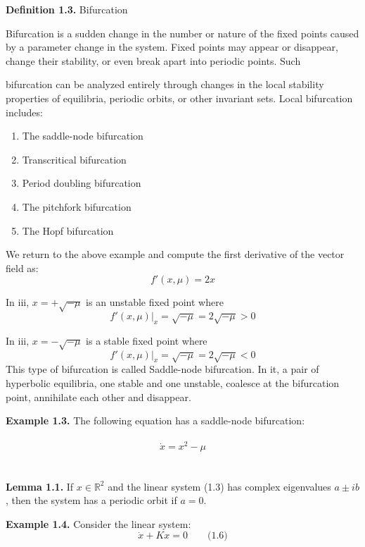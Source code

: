 \documentclass[17pt]{extarticle}
\begin{document}
\textbf{Definition 1.3.} Bifurcation

Bifurcation is a sudden change in the number or nature of the fixed points caused by a parameter change in the system. Fixed points may appear or disappear, change their stability, or even break apart into periodic points. Such

\newpage 



bifurcation can be analyzed entirely through changes in the local stability properties of equilibria, periodic orbits, or other invariant sets. Local bifurcation includes:
\begin{enumerate}
    \item The saddle-node bifurcation
    \item Transcritical bifurcation
    \item Period doubling bifurcation
    \item The pitchfork bifurcation
    \item The Hopf bifurcation
\end{enumerate}
We return to the above example and compute the first derivative of the vector field as:
\begin{equation}
f'(x, \mu) = 2x
\end{equation}


\newpage 

In iii, \(x = +\sqrt{-\mu}\) is an unstable fixed point where
\[
f'(x, \mu) \bigg|_{x} = \sqrt{-\mu} = 2\sqrt{-\mu} > 0
\]

In iii, \(x= - \sqrt{-\mu}\) is a stable fixed point where
\[
f'(x, \mu) \bigg|_{x} = \sqrt{-\mu} = 2\sqrt{-\mu} < 0
\]
This type of bifurcation is called Saddle-node bifurcation. In it, a pair of hyperbolic equilibria, one stable and one unstable, coalesce at the bifurcation point, annihilate each other and disappear.

\textbf{Example 1.3.} The following equation has a saddle-node bifurcation:
\\
\\
\[
\dot{x} = x^2 - \mu
\]
\\
\\
\textbf{Lemma 1.1.} If \(x \in \mathbb{R}^2\) and the linear system (1.3) has complex eigenvalues \(a \pm ib\), then the system has a periodic orbit if \(a =0\).

\textbf{Example 1.4.} Consider the linear system:
\[
\dot{x} + Kx = 0 \qquad \text{(1.6)}
\]
\end{document}
